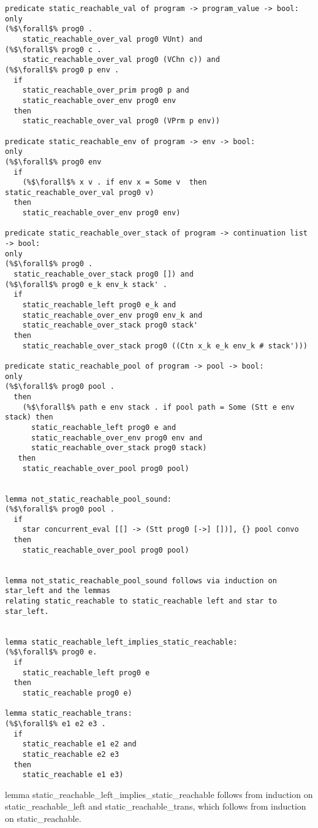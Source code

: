 \documentclass{article}
\begin{document}
\begin{lstlisting}[language=logic, style=codestyle1, escapechar=\%]
predicate static_reachable_val of program -> program_value -> bool:
only
(%$\forall$% prog0 .
    static_reachable_over_val prog0 VUnt) and
(%$\forall$% prog0 c .
    static_reachable_over_val prog0 (VChn c)) and
(%$\forall$% prog0 p env .
  if
    static_reachable_over_prim prog0 p and 
    static_reachable_over_env prog0 env
  then
    static_reachable_over_val prog0 (VPrm p env))

predicate static_reachable_env of program -> env -> bool:
only
(%$\forall$% prog0 env
  if
    (%$\forall$% x v . if env x = Some v  then static_reachable_over_val prog0 v)
  then
    static_reachable_over_env prog0 env)

predicate static_reachable_over_stack of program -> continuation list -> bool:
only
(%$\forall$% prog0 .
  static_reachable_over_stack prog0 []) and
(%$\forall$% prog0 e_k env_k stack' .
  if
    static_reachable_left prog0 e_k and 
    static_reachable_over_env prog0 env_k and
    static_reachable_over_stack prog0 stack' 
  then
    static_reachable_over_stack prog0 ((Ctn x_k e_k env_k # stack')))

predicate static_reachable_pool of program -> pool -> bool:
only
(%$\forall$% prog0 pool .
  then
    (%$\forall$% path e env stack . if pool path = Some (Stt e env stack) then 
      static_reachable_left prog0 e and 
      static_reachable_over_env prog0 env and 
      static_reachable_over_stack prog0 stack)
   then
    static_reachable_over_pool prog0 pool)


lemma not_static_reachable_pool_sound:
(%$\forall$% prog0 pool .
  if
    star concurrent_eval [[] -> (Stt prog0 [->] [])], {} pool convo 
  then
    static_reachable_over_pool prog0 pool)


lemma not_static_reachable_pool_sound follows via induction on star_left and the lemmas
relating static_reachable to static_reachable left and star to star_left.


lemma static_reachable_left_implies_static_reachable:
(%$\forall$% prog0 e. 
  if
    static_reachable_left prog0 e
  then
    static_reachable prog0 e)

lemma static_reachable_trans:
(%$\forall$% e1 e2 e3 .
  if 
    static_reachable e1 e2 and
    static_reachable e2 e3
  then
    static_reachable e1 e3)

\end{lstlisting}


lemma static\_reachable\_left\_implies\_static\_reachable follows from induction on
static\_reachable\_left and static\_reachable\_trans, which follows from induction on
static\_reachable.
\end{document}
